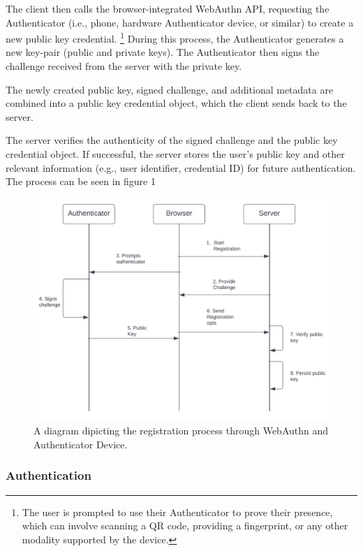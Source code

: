 The client then calls the browser-integrated WebAuthn API, requesting the Authenticator (i.e., phone, hardware Authenticator device, or similar)
to create a new public key credential.
\footnote{The user is prompted to use their Authenticator to prove their presence, which can involve scanning a QR code, providing a fingerprint, or any other modality supported by the device.} During this process, the Authenticator generates a new key-pair (public and private keys). The Authenticator then signs the challenge received from the server with the private key.

The newly created public key, signed challenge, and additional metadata are combined into a public key credential object,
which the client sends back to the server.

The server verifies the authenticity of the signed challenge and the public key credential object.
If successful, the server stores the user's public key and other relevant information (e.g., user identifier, credential ID)
for future authentication.
The process can be seen in figure 1
\begin{figure}[htbp]
    \centering
    \includegraphics[width=0.85\linewidth]{images/Registration}
    \caption{\footnotesize A diagram dipicting the registration process through WebAuthn and Authenticator Device.}
    \label{fig:your_label}
\end{figure}

\subsubsection*{Authentication}



